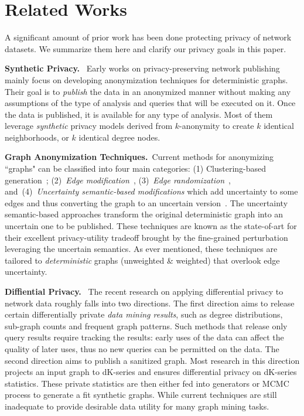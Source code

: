 \section{Related Works}
A significant amount of prior work has been done protecting privacy of network datasets.
We summarize them here and clarify our privacy goals in this paper. 

\textbf{Synthetic Privacy.}~ Early works on privacy-preserving network publishing mainly focus on developing anonymization techniques for deterministic graphs. Their goal is to \emph{publish} the data in an anonymized manner without making any assumptions of the type of analysis and queries that will be executed on it. Once the data is published, it is available for any type of analysis. 
Most of them leverage \emph{synthetic} privacy models derived from $k$-anonymity to create $k$ identical neighborhoods, or $k$ identical degree nodes.

\textbf{Graph Anonymization Techniques.}~Current methods for anonymizing ``graphs" can be classified into four main categories: (1) Clustering-based generation~\cite{Hay_Anonymizing_2007,Bhagat_Class_2009,hay2010resisting}; (2)~{\em Edge modification}~\cite{Liu_Towards_2008, Zhou_Preserving_2008, Wang2011, Wu_k_2010, Skarkala_Privacy_2012}, 
(3)~{\em Edge randomization}~\cite{Liu_Privacy_2009,Ying_Randomizing_2008, Ninggal_Utility_2015},
and~(4)~{\em Uncertainty semantic-based modifications} which add uncertainty to some edges and thus converting the graph to an uncertain version~\cite{Boldi_Injecting_2012, Nguyen_Anonymizing_2015}. The uncertainty semantic-based approaches transform the original deterministic graph into an uncertain one to be published. These techniques are known as the state-of-art for their excellent privacy-utility tradeoff brought by the fine-grained perturbation leveraging the uncertain semantics. As ever mentioned, these techniques are tailored to \emph{deterministic} graphs (unweighted \& weighted) that overlook edge uncertainty.  

\textbf{Diffiential Privacy.}~ The recent research on applying differential privacy to network data roughly falls into two directions. The first direction aims to release certain differentially private \emph{data mining results}, such as degree distributions, sub-graph counts and frequent graph patterns. Such methods that release only query results require tracking the results: early uses of the data can affect the quality of later uses, thus no new queries can be permitted on the data.  
The second direction aims to publish a sanitized graph. Most research in this direction projects an input graph to dK-series and ensures differential privacy on dK-series statistics. These private statistics are then either fed into generators or MCMC process to generate a fit synthetic graphs. While current techniques are still inadequate to provide desirable data utility for many graph mining tasks. 

